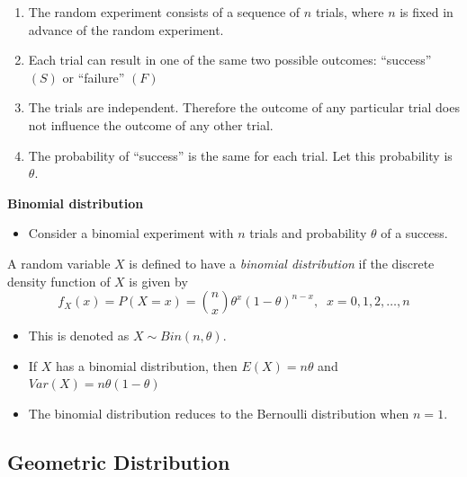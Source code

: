 \documentclass[]{book}
\providecommand{\tightlist}{%
  \setlength{\itemsep}{0pt}\setlength{\parskip}{0pt}}
\begin{document}
\begin{enumerate}
\def\labelenumi{\arabic{enumi}.}
\item
  The random experiment consists of a sequence of \(n\) trials, where \(n\) is fixed in advance of the random experiment.
\item
  Each trial can result in one of the same two possible outcomes: ``success'' \((S)\) or ``failure'' \((F)\)
\item
  The trials are independent. Therefore the outcome of any particular trial does not influence the outcome of any other trial.
\item
  The probability of ``success'' is the same for each trial. Let this probability is \(\theta.\)
\end{enumerate}

\textbf{Binomial distribution}

\begin{itemize}
\tightlist
\item
  Consider a binomial experiment with \(n\) trials and probability \(\theta\) of a success.
\end{itemize}

A random variable \(X\) is defined to have a \emph{binomial distribution} if the discrete density function of \(X\) is given by
\[f_X(x)= P(X=x)= {n\choose x}\theta ^x(1-\theta)^{n-x} , \;\; x=0,1,2,\dots, n\]

\begin{itemize}
\item
  This is denoted as \(X \sim Bin(n,\theta).\)
\item
  If \(X\) has a binomial distribution, then \(E(X) = n\theta\) and \(Var(X) = n\theta(1-\theta)\)
\item
  The binomial distribution reduces to the Bernoulli distribution when \(n=1.\)
\end{itemize}

\hypertarget{geometric-distribution}{%
\subsection{Geometric Distribution}\label{geometric-distribution}}
\end{document}
